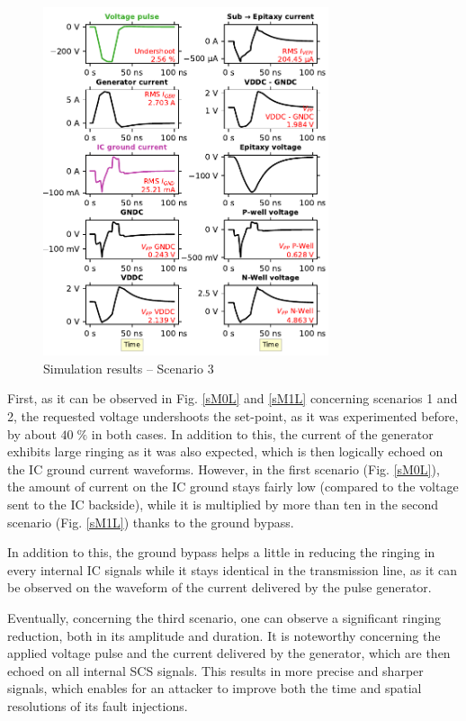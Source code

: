 \documentclass[10pt, conference, compsocconf]{IEEEtran}
\begin{document}
\begin{figure}[!hbtp]
\centering
\includegraphics[width=3.3in]{latexM2_T}
\caption{Simulation results – Scenario 3}
\label{sM2L}
\end{figure}

First, as it can be observed in Fig. \ref{sM0L} and \ref{sM1L} concerning scenarios 1 and 2, the requested voltage undershoots the set-point, as it was experimented before, by about $40 \; \%$ in both cases.
In addition to this, the current of the generator exhibits large ringing as it was also expected, which is then logically echoed on the IC ground current waveforms.
However, in the first scenario (Fig. \ref{sM0L}), the amount of current on the IC ground stays fairly low (compared to the voltage sent to the IC backside), while it is multiplied by more than ten in the second scenario (Fig. \ref{sM1L}) thanks to the ground bypass.

In addition to this, the ground bypass helps a little in reducing the ringing in every internal IC signals while it stays identical in the transmission line, as it can be observed on the waveform of the current delivered by the pulse generator.

Eventually, concerning the third scenario, one can observe a significant ringing reduction, both in its amplitude and duration.
It is noteworthy concerning the applied voltage pulse and the current delivered by the generator, which are then echoed on all internal SCS signals.
This results in more precise and sharper signals, which enables for an attacker to improve both the time and spatial resolutions of its fault injections.
\end{document}
